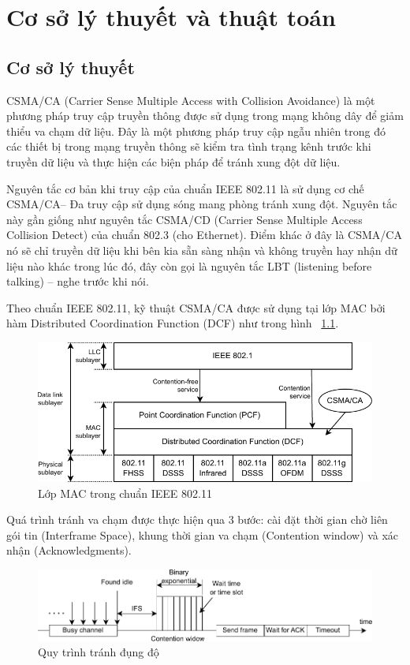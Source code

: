 \chapter{Cơ sở lý thuyết và thuật toán}
\label{ch::chapter2}
\section{Cơ sở lý thuyết}

CSMA/CA (Carrier Sense Multiple Access with Collision Avoidance) là một phương pháp truy cập truyền 
thông được sử dụng trong mạng không dây để giảm thiểu va chạm dữ liệu. Đây là một phương pháp truy 
cập ngẫu nhiên trong đó các thiết bị trong mạng truyền thông sẽ kiểm tra tình trạng kênh trước khi 
truyền dữ liệu và thực hiện các biện pháp để tránh xung đột dữ liệu.

Nguyên tắc cơ bản khi truy cập của chuẩn IEEE 802.11 là sử dụng cơ chế CSMA/CA– Đa truy cập sử dụng sóng 
mang phòng tránh xung đột. Nguyên tắc này gần giống như nguyên tắc CSMA/CD (Carrier Sense Multiple 
Access Collision Detect) của chuẩn 802.3 (cho Ethernet). Điểm khác ở đây là CSMA/CA nó sẽ chỉ truyền 
dữ liệu khi bên kia sẵn sàng nhận và không truyền hay nhận dữ liệu nào khác trong lúc đó, đây còn gọi 
là nguyên tắc LBT (listening before talking) – nghe trước khi nói.

Theo chuẩn IEEE 802.11, kỹ thuật CSMA/CA được sử dụng tại lớp MAC bởi hàm Distributed Coordination Function (DCF) như trong hình ~\ref{fig:mac}.
\begin{figure}[h]
    \centering
    \includegraphics[width=0.65\linewidth]{figures/Chapter2/MAClayer_k2opt.pdf}
    \caption{Lớp MAC trong chuẩn IEEE 802.11}
    \label{fig:mac}
\end{figure}

Quá trình tránh va chạm được thực hiện qua 3 bước: cài đặt thời gian chờ liên gói tin (Interframe Space), khung thời gian
va chạm (Contention window) và xác nhận (Acknowledgments).

\begin{figure}[h]
    \centering
    \includegraphics[width=1.1\linewidth]{figures/Chapter2/Procedure_k2opt.pdf}
    \caption{Quy trình tránh đụng độ}
    \label{fig:procedure}
\end{figure}

